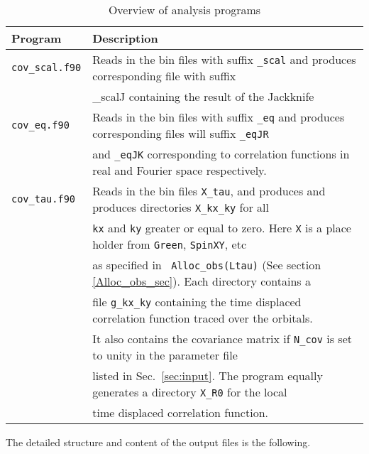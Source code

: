 \begin{table}[h]
   \begin{tabular}{l l}
   Program & Description \\\hline
   \texttt{cov\_scal.f90}  &  Reads in the bin files with suffix \texttt{\_scal}  and produces  corresponding file with suffix  \\ 
                                     &   {\_scalJ}  containing the  result of the Jackknife  \\
   \texttt{cov\_eq.f90}    &   Reads in the bin files with suffix \texttt{\_eq}  and produces  corresponding files will suffix  \texttt{\_eqJR}  \\
                                     &   and  \texttt{\_eqJK}   corresponding to correlation functions in real and Fourier space respectively.  \\
   \texttt{cov\_tau.f90}   &   Reads in the bin files  \texttt{X\_tau}, and produces   and produces directories  \texttt{X\_kx\_ky}   for all  \\
                                     &   \texttt{kx} and \texttt{ky} greater or equal to zero.   Here \texttt{X}  is a place holder from \texttt{Green}, \texttt{SpinXY}, etc  \\
                                     &  as specified in \texttt{ Alloc\_obs(Ltau)} (See section \ref{Alloc_obs_sec}).  Each directory contains  a \\ 
                                     &   file    \texttt{g\_kx\_ky}    containing the  time displaced correlation function traced over the  orbitals.  \\ 
                                     &  It also contains the  covariance matrix if \texttt{N\_cov} is set to unity in the parameter file  \\
                                     &  listed in Sec.~\ref{sec:input}.  The program equally generates a directory  \texttt{X\_R0}  for the local \\
                                     &  time displaced  correlation function.  
                                     
    \end{tabular}
   \caption{ Overview of analysis programs \label{table:analysis_programs}}
\end{table}

The  detailed structure and content of the  output files is the following. 